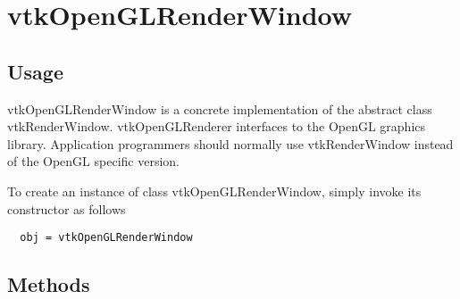 \section{vtkOpenGLRenderWindow}

\subsection{Usage}

 vtkOpenGLRenderWindow is a concrete implementation of the abstract class
 vtkRenderWindow. vtkOpenGLRenderer interfaces to the OpenGL graphics
 library. Application programmers should normally use vtkRenderWindow
 instead of the OpenGL specific version.

To create an instance of class vtkOpenGLRenderWindow, simply
invoke its constructor as follows
\begin{verbatim}
  obj = vtkOpenGLRenderWindow
\end{verbatim}
\subsection{Methods}

